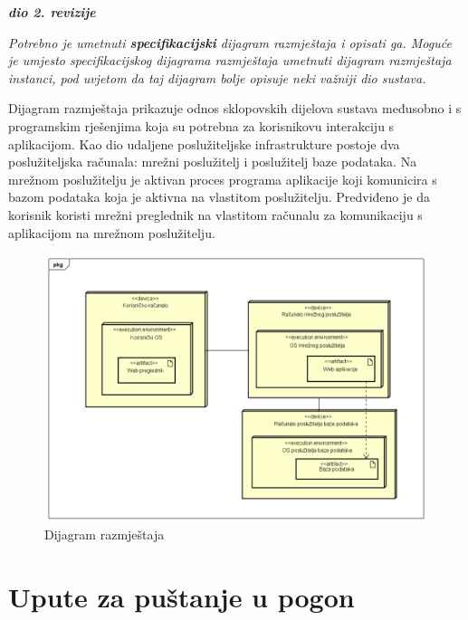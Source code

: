 			\textbf{\textit{dio 2. revizije}}
			
			 \textit{Potrebno je umetnuti \textbf{specifikacijski} dijagram razmještaja i opisati ga. Moguće je umjesto specifikacijskog dijagrama razmještaja umetnuti dijagram razmještaja instanci, pod uvjetom da taj dijagram bolje opisuje neki važniji dio sustava.}
			 
			 \indent Dijagram razmještaja prikazuje odnos sklopovskih dijelova sustava međusobno i s programskim rješenjima koja su potrebna za korisnikovu interakciju s aplikacijom. Kao dio udaljene poslužiteljske infrastrukture postoje dva poslužiteljska računala: mrežni poslužitelj i poslužitelj baze podataka. Na mrežnom poslužitelju je aktivan proces programa aplikacije koji komunicira s bazom podataka koja je aktivna na vlastitom poslužitelju. Predviđeno je da korisnik koristi mrežni preglednik na vlastitom računalu za komunikaciju s aplikacijom na mrežnom poslužitelju.
			 
			 \begin{figure} [hbt!]
			 	\includegraphics[width=\linewidth]{Slike/DeploymentDiagram}
			 	\caption{Dijagram razmještaja}
			 \end{figure}
			
			\eject 
		
		\section{Upute za puštanje u pogon}
		
